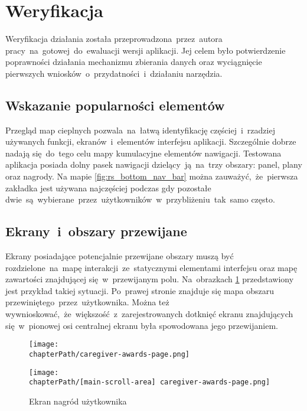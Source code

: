 \section{Weryfikacja}
Weryfikacja działania została przeprowadzona~przez~autora pracy~na~gotowej~do~ewaluacji wersji aplikacji. Jej celem było potwierdzenie poprawności działania mechanizmu zbierania danych oraz wyciągnięcie pierwszych wniosków~o~przydatności~i~działaniu narzędzia.

\subsection{Wskazanie popularności elementów}
Przegląd map cieplnych pozwala~na~łatwą identyfikację częściej~i~rzadziej używanych funkcji, ekranów~i~elementów interfejsu aplikacji. Szczególnie dobrze nadają się~do~tego celu mapy kumulacyjne elementów nawigacji. Testowana aplikacja posiada dolny pasek nawigacji dzielący~ją~na~trzy obszary: panel, plany oraz nagrody. Na mapie \ref{fig:rs_bottom_nav_bar} można zauważyć,~że~pierwsza zakładka jest używana najczęściej podczas gdy pozostałe dwie~są~wybierane~przez~użytkowników~w~przybliżeniu~tak~samo często.

\bigskip
{}

\subsection{Ekrany~i~obszary przewijane}
Ekrany posiadające potencjalnie przewijane obszary muszą być rozdzielone~na~mapę interakcji~ze~statycznymi elementami interfejsu oraz mapę zawartości znajdującej się~w~przewijanym polu. Na~obrazkach \ref{fig:rs_panel_parts} przedstawiony jest przykład takiej sytuacji. Po~prawej stronie znajduje się mapa obszaru przewiniętego~przez~użytkownika. Można też wywnioskować,~że~większość~z~zarejestrowanych dotknięć ekranu znajdujących się~w~pionowej osi centralnej ekranu była spowodowana jego przewijaniem. 

\bigskip
\begin{figure}[H]
\centering
\begin{minipage}{.35\textwidth}
	\centering
	\texttt{[image: \\chapterPath/caregiver-awards-page.png]}
\end{minipage}
\begin{minipage}{.3\textwidth}
	\centering
	\texttt{[image: \\chapterPath/[main-scroll-area] caregiver-awards-page.png]}
\end{minipage}
\bigskip
\caption{Ekran nagród użytkownika}
\label{fig:rs_panel_parts}
\end{figure}

